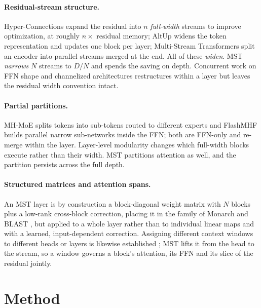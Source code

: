 \documentclass{article}
\newcommand{\dmodel}{D}
\newcommand{\nsub}{N}
\begin{document}
\paragraph{Residual-stream structure.} Hyper-Connections
\citep{hyperconnections2025, xie2026mhc} expand the residual into $n$
\emph{full-width} streams to improve optimization, at roughly $n\times$ residual
memory; AltUp \citep{baykal2023altup} widens the token representation and updates
one block per layer; Multi-Stream Transformers \citep{burtsev2021multistream}
split an encoder into parallel streams merged at the end. All of these
\emph{widen}. MST \emph{narrows} $\nsub$ streams to $\dmodel/\nsub$ and spends
the saving on depth. Concurrent work on FFN shape \citep{shape2026} and
channelized architectures \citep{dualstream2026} restructures within a layer but
leaves the residual width convention intact.

\paragraph{Partial partitions.} MH-MoE \citep{wu2024mhmoe} splits tokens into
sub-tokens routed to different experts and FlashMHF \citep{zhang2026flashmhf}
builds parallel narrow sub-networks inside the FFN; both are FFN-only and re-merge
within the layer. Layer-level modularity \citep{raposo2024mod, csordas2024moeut,
bae2025mor} changes which full-width blocks execute rather than their width. MST
partitions attention as well, and the partition persists across the full depth.

\paragraph{Structured matrices and attention spans.} An MST layer is by
construction a block-diagonal weight matrix with $\nsub$ blocks plus a low-rank
cross-block correction, placing it in the family of Monarch \citep{dao2022monarch}
and BLAST \citep{lee2024blast}, but applied to a whole layer rather than to
individual linear maps and with a learned, input-dependent correction. Assigning
different context windows to different heads or layers is likewise established
\citep{sukhbaatar2019adaptive, beltagy2020longformer, fu2024moa, zhang2025mswa};
MST lifts it from the head to the stream, so a window governs a block's attention,
its FFN and its slice of the residual jointly.

\section{Method}
\label{sec:method}
\end{document}
